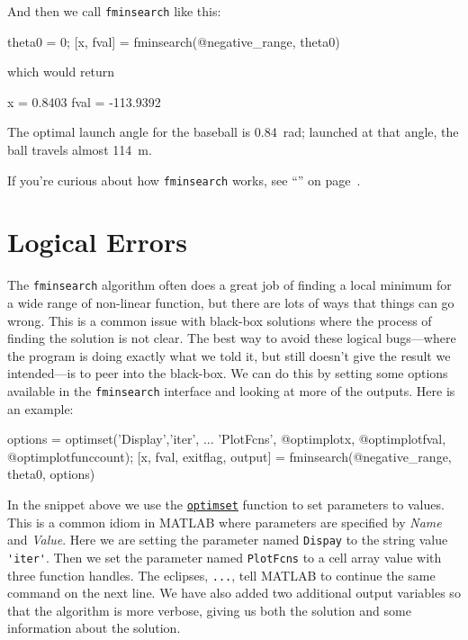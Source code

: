 And then we call \lstinline{fminsearch} like this:

\begin{code}
    theta0 = 0;
    [x, fval] = fminsearch(@negative_range, theta0)
\end{code}
which would return
\begin{code}
    x =
    0.8403
fval =
 -113.9392
\end{code}

The optimal launch angle for the baseball is \SI{0.84}{\radian}; launched at that angle, the ball travels almost \SI{114}{\meter}.

If you're curious about how \lstinline{fminsearch} works, see ``'' on page~\pageref{howfminsearch}.

\section{Logical Errors}

The \lstinline{fminsearch} algorithm often does a great job of finding a local minimum for a wide range of non-linear function, but there are lots of ways that things can go wrong.  This is a common issue with black-box solutions where the process of finding the solution is not clear.   The best way to avoid these logical bugs---where the program is doing exactly what we told it, but still doesn't give the result we intended---is to peer into the black-box. We can do this by setting some options available in the \lstinline{fminsearch} interface and looking at more of the outputs.  Here is an example:

\begin{code}
    options = optimset('Display','iter', ...
        'PlotFcns', {@optimplotx, @optimplotfval, @optimplotfunccount});
    [x, fval, exitflag, output] = fminsearch(@negative_range, theta0, options)
\end{code}

In the snippet above we use the \href{https://www.mathworks.com/help/matlab/ref/optimset.html}{\lstinline{optimset}} function to set parameters to values.  This is a common idiom in MATLAB where parameters are specified by \emph{Name} and \emph{Value}.  Here we are setting the parameter named \lstinline{Dispay} to the string value \lstinline{'iter'}.  Then we set the parameter named \lstinline{PlotFcns} to a cell array value with three function handles.  The eclipses, \lstinline{...}, tell MATLAB to continue the same command on the next line.  We have also added two additional output variables so that the algorithm is more verbose, giving us both the solution and some information about the solution.

